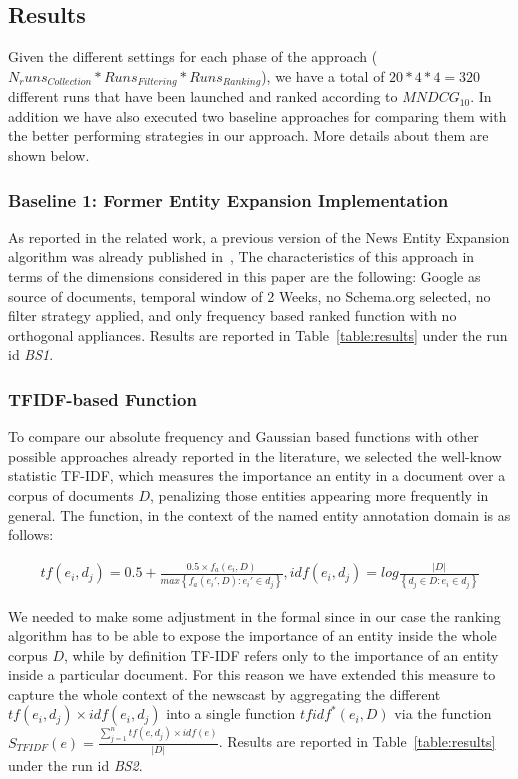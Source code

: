 \documentclass{llncs}
\begin{document}
\subsection{Results}
\label{sec:results}

Given the different settings for each phase of the approach ($N_runs_{Collection} * Runs_{Filtering} * Runs_{Ranking}$), we have a total of  $20 * 4 * 4 = 320$ different runs that have been launched and ranked according to $MNDCG_{10}$. In addition we have also executed two baseline approaches for comparing them with the better performing strategies in our approach. More details about them are shown below.

\subsubsection{Baseline 1: Former Entity Expansion Implementation}
As reported in the related work, a previous version of the News Entity Expansion algorithm was already published in~\cite{RedondoGarcia2014}, The characteristics of this approach in terms of the dimensions considered in this paper are the following: Google as source of documents, temporal window of 2 Weeks, no Schema.org selected, no filter strategy applied, and only frequency based ranked function with no orthogonal appliances. Results are reported in Table~\ref{table:results} under the run id \textit{BS1}.
 
\subsubsection{TFIDF-based Function}
To compare our absolute frequency and Gaussian based functions with other possible approaches already reported in the literature, we selected the well-know statistic TF-IDF, which measures the importance an entity in a document over a corpus of documents $D$, penalizing those entities appearing more frequently in general. The function, in the context of the named entity annotation domain is as follows:

\begin{equation}
\begin{matrix}
tf(e_i,d_j) = 0.5 + \frac{0.5\times f_{a}(e_i,D)}{max\left \{ f_{a}(e_i',D) : e_i' \in d_j\right \}},   idf(e_i,d_j) = log\frac{\left | D \right |}{\left \{ d_j\in D  :  e_i\in d_j \right \}}
\end{matrix}
\end{equation}

We needed to make some adjustment in the formal since in our case the ranking algorithm has to be able to expose the importance of an entity inside the whole corpus $D$, while by definition TF-IDF refers only to the importance of an entity inside a particular document.  For this reason we have extended this measure to capture the whole context of the newscast by aggregating the different $tf(e_i,d_j) \times idf(e_i,d_j)$ into a single function $tfidf^{*}(e_i,D)$ via the function $S_{TFIDF}(e)= \frac{ \sum_{j=1}^{n}  tf(e,d_j) \times idf(e)} {|D|}$.  Results are reported in Table~\ref{table:results} under the run id \textit{BS2}.
\end{document}
